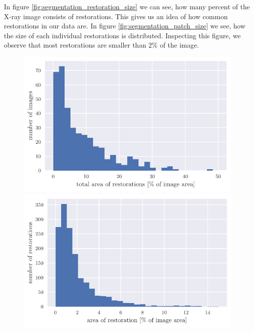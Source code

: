 In figure \ref{fig:segmentation_restoration_size} we can see, how many percent of the X-ray image consists of restorations. This gives us an idea of how common restorations in our data are. In figure \ref{fig:segmentation_patch_size} we see, how the size of each individual restorations is distributed. Inspecting this figure, we observe that most restorations are smaller than $2\%$ of the image.

\begin{figure}
    \centering
    \begin{floatrow}[2]
        {\includegraphics[width=\linewidth]{images/histogram_of_restoration_size.pdf}}\;
        {\includegraphics[width=\linewidth]{images/histogram_of_patch_size.pdf}}
    \end{floatrow}
\end{figure}